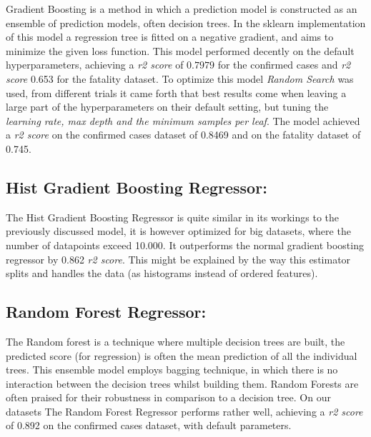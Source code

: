 \documentclass{article}
\begin{document}
Gradient Boosting is a method in which a prediction model is constructed as an ensemble of prediction models, often decision trees. In the sklearn implementation of this model a regression tree is fitted on a negative gradient, and aims to minimize the given loss function. 
This model performed decently on the default hyperparameters, achieving a \emph{r2 score} of $0.7979$ for the confirmed cases and \emph{r2 score} 0.653 for the fatality dataset. To optimize this model \emph{Random Search} was used, from different trials it came forth that best results come when leaving a large part of the hyperparameters on their default setting, but tuning the \emph{learning rate, max depth and the minimum samples per leaf}. The model achieved a \emph{r2 score} on the confirmed cases dataset of 0.8469 and on the fatality dataset of 0.745. 

\subsection{Hist Gradient Boosting Regressor:}
The Hist Gradient Boosting Regressor is quite similar in its workings to the previously discussed model, it is however optimized for big datasets, where the number of datapoints exceed 10.000. 
It outperforms the normal gradient boosting regressor by 0.862 \emph{r2 score}. This might be explained by the way this estimator splits and handles the data (as histograms instead of ordered features). 

\subsection{Random Forest Regressor:}
The Random forest is a technique where multiple decision trees are built, the predicted score (for regression) is often the mean prediction of all the individual trees. This ensemble model employs bagging technique, in which there is no interaction between the decision trees whilst building them. 
Random Forests are often praised for their robustness in comparison to a decision tree. 
On our datasets The Random Forest Regressor performs rather well, achieving a \emph{r2 score} of 0.892 on the confirmed cases dataset, with default parameters.
\end{document}
